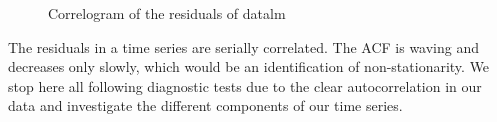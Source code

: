 \documentclass[10pt, a4paper]{article} %
\begin{document}
\begin{figure}[H]
\begin{center}
\qquad
{}
\qquad
{}
\end{center}
\caption{Correlogram of the residuals of datalm}
\label{corr_res_lm}
\end{figure}

\linebreak

\noindent	The residuals in a time series are serially correlated. The ACF is waving and decreases only slowly, which would be an identification of non-stationarity. We stop here all following diagnostic tests due to the clear autocorrelation in our data and investigate the different components of our time series. \\
  
\end{document}
